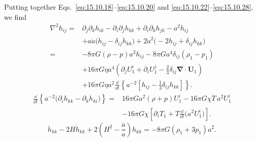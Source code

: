 Putting together Eqs.~\eqref{eq:15.10.18}--\eqref{eq:15.10.20} and
\eqref{eq:15.10.22}--\eqref{eq:15.10.28}, we find
\begin{equation}
  \begin{split}
  \nabla^2h_{ij}
  ={}&
  \partial_j\partial_kh_{ik}
  -\partial_i\partial_jh_{kk}
  +\partial_i\partial_kh_{jk}
  -a^2\ddot h_{ij}\\
  &+a\dot a\bigl(\dot h_{ij}-\delta_{ij}\dot h_{kk}\bigr)
  +2\dot a^2\bigl(-2h_{ij}+\delta_{ij}h_{kk}\bigr)\\
  ={}&
  -8\pi G(\rho-p)a^2h_{ij}
  -8\pi Ga^4\delta_{ij}(\rho_1-p_1)\\
  &+16\pi G\eta a^4
  \left(
    \partial_jU_1^i+\partial_iU_1^j
    -\frac23\delta_{ij}\boldsymbol{\nabla}\cdot\mathbf U_1
  \right)\\
  &+16\pi G\eta a^2\frac{\dd}{\dd t}
  \left\{
    a^{-2}
    \left[h_{ij}-\frac13\delta_{ij}h_{kk}\right]
  \right\}.
  \end{split}
  \tag{15.10.29}\label{eq:15.10.29}
\end{equation}
\begin{equation}
  \begin{split}
  \frac{\dd}{\dd t}
  \left\{
    a^{-2}
    \bigl(\partial_i h_{kk}-\partial_kh_{ki}\bigr)
  \right\}
  ={}&
  16\pi Ga^2(\rho+p)U_1^i
  -16\pi G\chi\dot T\,a^2U_1^i\\
  &-16\pi G\chi
  \left[
    \partial_iT_1
    +T\frac{\dd}{\dd t}\bigl(a^2U_1^i\bigr)
  \right].
  \end{split}
  \tag{15.10.30}\label{eq:15.10.30}
\end{equation}
\begin{equation}
  \ddot h_{kk}
  -2H\dot h_{kk}
  +2\left(H^2-\frac{\ddot a}{a}\right)h_{kk}
  =
  -8\pi G(\rho_1+3p_1)a^2.
  \tag{15.10.31}\label{eq:15.10.31}
\end{equation}

